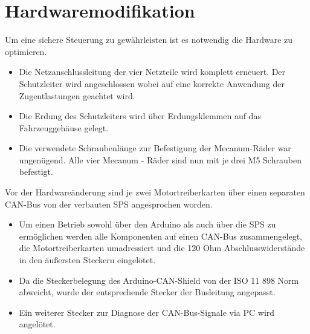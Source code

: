 
\section{Hardwaremodifikation}
\label{sec:Hardwaremodifikation}

Um eine sichere Steuerung zu gewährleisten ist es notwendig die Hardware zu optimieren.
\begin{itemize}
\item{Die Netzanschlussleitung der vier Netzteile wird komplett erneuert. Der Schutzleiter wird angeschlossen wobei auf eine korrekte Anwendung der Zugentlastungen geachtet wird.}
\item{Die Erdung des Schutzleiters wird über Erdungsklemmen auf das Fahrzeuggehäuse gelegt.}

\item{Die verwendete Schraubenlänge zur Befestigung der Mecanum-Räder war ungenügend. Alle vier Mecanum - Räder sind nun mit je drei M5 Schrauben befestigt.}
\end{itemize}

Vor der Hardwareänderung sind je zwei Motortreiberkarten über einen separaten CAN-Bus von der verbauten SPS angesprochen worden. 
\begin{itemize}
\item{Um einen Betrieb sowohl über den Arduino als auch über die SPS zu ermöglichen werden alle Komponenten auf einen CAN-Bus zusammengelegt, die Motortreiberkarten umadressiert und die 120 Ohm Abschlusswiderstände in den äußersten Steckern eingelötet.}
\item{Da die Steckerbelegung des Arduino-CAN-Shield von der ISO 11 898 Norm abweicht, wurde der entsprechende Stecker der Busleitung angepasst.}
\item{Ein weiterer Stecker zur Diagnose der CAN-Bus-Signale via PC wird angelötet.}

\end{itemize}